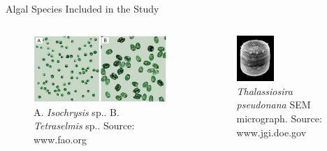 \documentclass[8pt]{beamer}\usepackage[]{graphicx}\usepackage[]{color}
\begin{document}
\begin{frame}[fragile]{Algal Species Included in the Study}
\begin{columns}[t] %
                        \begin{figure}
                                \includegraphics[width=1\textwidth]{./figure/FAO_Isochrysis_Tetraselmis.jpg}
                                \caption{A. {\it Isochrysis} sp.. B. {\it Tetraselmis} sp.. Source: www.fao.org}
                        \end{figure}
                        \begin{figure}
                                \includegraphics[width=0.4\textwidth]{./figure/Thal_psuedonana.jpg}
                                \caption{{\it Thalassiosira pseudonana} SEM micrograph. Source: www.jgi.doe.gov}
                        \end{figure}
        \end{columns}

\end{frame}
\end{document}
